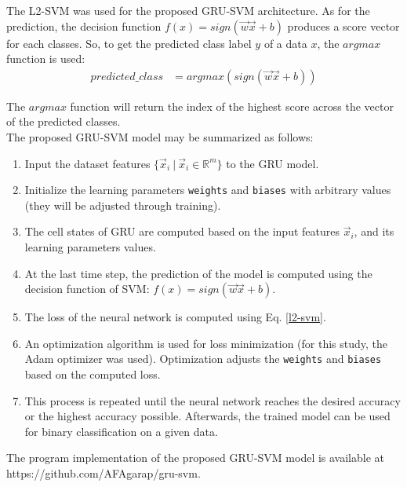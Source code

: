 The L2-SVM was used for the proposed GRU-SVM architecture. As for the prediction, the decision function $f(x) = sign(\vec{w}\vec{x}+b)$ produces a score vector for each classes. So, to get the predicted class label $y$ of a data $x$, the $argmax$ function is used:
\begin{align*}
predicted\_class &= argmax(sign(\vec{w}\vec{x} + b))
\end{align*}

The $argmax$ function will return the index of the highest score across the vector of the predicted classes.\\
\indent	The proposed GRU-SVM model may be summarized as follows:
\begin{enumerate}
\item	Input the dataset features $\{\vec{x}_{i}\ |\ \vec{x}_{i} \in \mathbb{R}^{m}\}$ to the GRU model.
\item	Initialize the learning parameters \texttt{weights} and \texttt{biases} with arbitrary values (they will be adjusted through training).
\item	The cell states of GRU are computed based on the input features $\vec{x}_{i}$, and its learning parameters values.
\item	At the last time step, the prediction of the model is computed using the decision function of SVM: $f(x) = sign(\vec{w}\vec{x} + b)$.
\item	The loss of the neural network is computed using Eq. \ref{l2-svm}.
\item	An optimization algorithm is used for loss minimization (for this study, the Adam\cite{Kingma} optimizer was used). Optimization adjusts the \texttt{weights} and \texttt{biases} based on the computed loss.
\item	This process is repeated until the neural network reaches the desired accuracy or the highest accuracy possible. Afterwards, the trained model can be used for binary classification on a given data.
\end{enumerate}

The program implementation of the proposed GRU-SVM model is available at https://github.com/AFAgarap/gru-svm.

